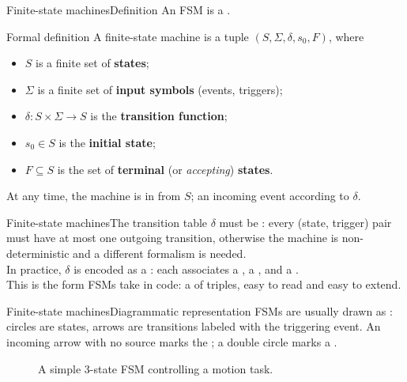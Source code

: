 \begin{frame}{Finite-state machines}{Definition}
  \justifying
  An FSM is a .
  \begin{block}{Formal definition}
    \justifying
    A finite-state machine is a tuple $(S, \Sigma, \delta, s_0, F)$, where
    \begin{itemize}
      \item $S$ is a finite set of \textbf{states};
      \item $\Sigma$ is a finite set of \textbf{input symbols} (events, triggers);
      \item $\delta : S \times \Sigma \to S$ is the \textbf{transition function};
      \item $s_0 \in S$ is the \textbf{initial state};
      \item $F \subseteq S$ is the set of \textbf{terminal} (or \emph{accepting}) \textbf{states}.
    \end{itemize}
  \end{block}
  At any time, the machine is in  from $S$; an incoming event  according to $\delta$.
\end{frame}
\begin{frame}{Finite-state machines}{The transition table}
  \justifying
  $\delta$ must be : every (state, trigger) pair must have at most one outgoing transition, otherwise the machine is non-deterministic and a different formalism is needed.\\
  \bigskip
  In practice, $\delta$ is encoded as a : each  associates a , a , and a .\\
  \bigskip
  This is the form FSMs take in code: a  of triples, easy to read and easy to extend.
\end{frame}
\begin{frame}{Finite-state machines}{Diagrammatic representation}
  \justifying
  FSMs are usually drawn as : circles are states, arrows are transitions labeled with the triggering event. An incoming arrow with no source marks the ; a double circle marks a .
  \begin{figure}
    \centering
    \caption{A simple 3-state FSM controlling a motion task.}
  \end{figure}
\end{frame}

